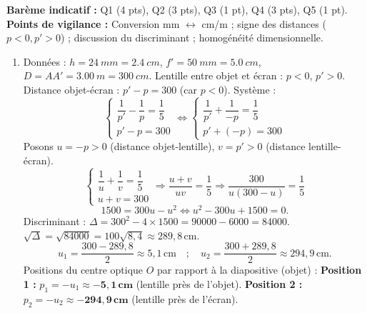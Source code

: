 \documentclass[11pt]{article}
\begin{document}
\begin{corrige}
\textbf{Barème indicatif :} Q1 (4 pts), Q2 (3 pts), Q3 (1 pt), Q4 (3 pts), Q5 (1 pt).
\textbf{Points de vigilance :} Conversion mm $\leftrightarrow$ cm/m ; signe des distances ($p<0, p'>0$) ; discussion du discriminant ; homogénéité dimensionnelle.
\begin{enumerate}
    \item Données : $h = \SI{24}{mm} = \SI{2,4}{cm}$, $f' = \SI{50}{mm} = \SI{5,0}{cm}$, $D = AA' = \SI{3,00}{m} = \SI{300}{cm}$.
    Lentille entre objet et écran : $p<0$, $p'>0$. Distance objet-écran : $p' - p = 300$ (car $p<0$).
    Système :
    \[ \begin{cases} \dfrac{1}{p'} - \dfrac{1}{p} = \dfrac{1}{5} \\ p' - p = 300 \end{cases} \iff \begin{cases} \dfrac{1}{p'} + \dfrac{1}{-p} = \dfrac{1}{5} \\ p' + (-p) = 300 \end{cases} \]
    Posons $u = -p > 0$ (distance objet-lentille), $v = p' > 0$ (distance lentille-écran).
    \[ \begin{cases} \dfrac{1}{u} + \dfrac{1}{v} = \dfrac{1}{5} \\ u + v = 300 \end{cases} \Rightarrow \dfrac{u+v}{uv} = \dfrac{1}{5} \Rightarrow \dfrac{300}{u(300-u)} = \dfrac{1}{5} \]
    \[ 1500 = 300u - u^2 \iff u^2 - 300u + 1500 = 0. \]
    Discriminant : $\Delta = 300^2 - 4\times 1500 = 90000 - 6000 = 84000$.
    $\sqrt{\Delta} = \sqrt{84000} = 100\sqrt{8,4} \approx 289,8\,\text{cm}$.
    \[ u_1 = \frac{300 - 289,8}{2} \approx 5,1\,\text{cm} \quad;\quad u_2 = \frac{300 + 289,8}{2} \approx 294,9\,\text{cm}. \]
    Positions du centre optique $O$ par rapport à la diapositive (objet) :
    \textbf{Position 1 :} $p_1 = -u_1 \approx \mathbf{-5,1\,cm}$ (lentille près de l'objet).
    \textbf{Position 2 :} $p_2 = -u_2 \approx \mathbf{-294,9\,cm}$ (lentille près de l'écran).
    \begin{popfigure}
\end{popfigure}
\end{enumerate}
\end{corrige}
\end{document}
